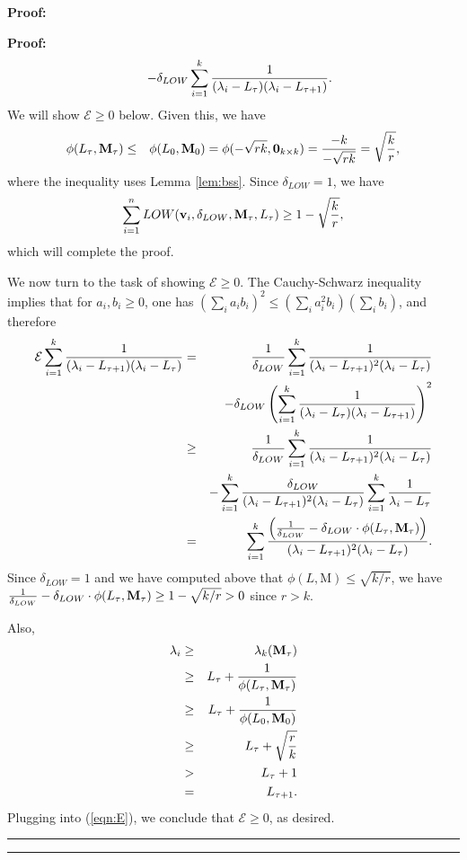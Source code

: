 \documentclass[11pt]{article}
\newenvironment{proof}{\begin{trivlist} \item {\bf Proof:~~}}
  {\qed\end{trivlist}}
\newcommand{\mat}[1]{{\ensuremath{\bm{\mathrm{#1}}}}}
\def\ve{{\mathbf v}}
\def\matM{\mat{M}}
\def\frac#1#2{{#1\over #2}}
\def\qed{\hfill\rule{2mm}{2mm}}
\begin{document}
\begin{proof}
\begin{proof}
\begin{eqnarray*}
&& - \delta_{LOW} \sum_{i=1}^k \frac{1}{(\lambda_i -L_{\tau})(\lambda_i - L_{\tau +1})}.
\end{eqnarray*}
We will show $\mathcal{E} \geq 0$ below. Given this, we have
\begin{eqnarray*}
\phi(L_{\tau}, \matM_{\tau}) & \leq & \phi(L_0, \matM_0)
 = \phi(- \sqrt{rk}, \mat0_{k \times k})
 = \frac{-k}{-\sqrt{rk}}
 = \sqrt{\frac{k}{r}},
\end{eqnarray*}
where the inequality uses Lemma \ref{lem:bss}. Since $\delta_{LOW} = 1$, we 
have 
$$\sum_{i=1}^n LOW(\ve_i, \delta_{LOW}, \matM_{\tau}, L_{\tau}) \geq 1-\sqrt{\frac{k}{r}},$$
which will complete the proof. 

We now turn to the task of showing $\mathcal{E} \geq 0$. The Cauchy-Schwarz inequality implies
that for $a_i, b_i \geq 0$, one has $(\sum_i a_i b_i)^2 \leq (\sum_i a_i^2 b_i)(\sum_i b_i)$, 
and therefore
\begin{eqnarray}\label{eqn:E}
\mathcal{E} \sum_{i=1}^k \frac{1}{(\lambda_i - L_{\tau + 1})(\lambda_i - L_{\tau})}
& = & \frac{1}{\delta_{LOW}} \sum_{i=1}^k \frac{1}{(\lambda_i - L_{\tau + 1})^2 (\lambda_i - L_{\tau})} \notag \\
&& - \delta_{LOW} \left (\sum_{i=1}^k \frac{1}{(\lambda_i - L_{\tau})(\lambda_i - L_{\tau + 1})} \right )^2 \notag \\
& \geq & \frac{1}{\delta_{LOW}} \sum_{i=1}^k \frac{1}{(\lambda_i - L_{\tau + 1})^2 (\lambda_i - L_{\tau})} \notag \\
&& - \sum_{i=1}^k \frac{\delta_{LOW}}{(\lambda_i - L_{\tau + 1})^2(\lambda_i - L_{\tau})} \sum_{i=1}^k \frac{1}{\lambda_i - L_{\tau}} \notag \\
& = & 
\sum_{i=1}^k \frac{\left (\frac{1}{\delta_{LOW}} - \delta_{LOW} \cdot \phi(L_{\tau}, \matM_{\tau}) \right )}{(\lambda_i - L_{\tau+1})^2(\lambda_i - L_{\tau})}.
\end{eqnarray}
Since $\delta_{LOW} = 1$ and we have computed above that $\phi(L, \matM) \leq \sqrt{k/r}$, 
we have $\frac{1}{\delta_{LOW}} - \delta_{LOW} \cdot \phi(L_{\tau}, \matM_{\tau}) \geq 1-\sqrt{k/r} > 0$
since $r > k$. 

Also, 
\begin{eqnarray*}
\lambda_i & \geq & \lambda_k(\matM_{\tau})\\
& \geq & L_{\tau} + \frac{1}{\phi(L_{\tau}, \matM_{\tau})}\\
& \geq & L_{\tau} + \frac{1}{\phi(L_0, \matM_0)}\\
& \geq & L_{\tau} + \sqrt{\frac{r}{k}}\\
& > & L_{\tau} + 1\\
& = & L_{\tau+1}.
\end{eqnarray*}
Plugging into (\ref{eqn:E}), we conclude that $\mathcal{E} \geq 0$, as desired. 
\end{proof}


\end{proof}
\end{document}
